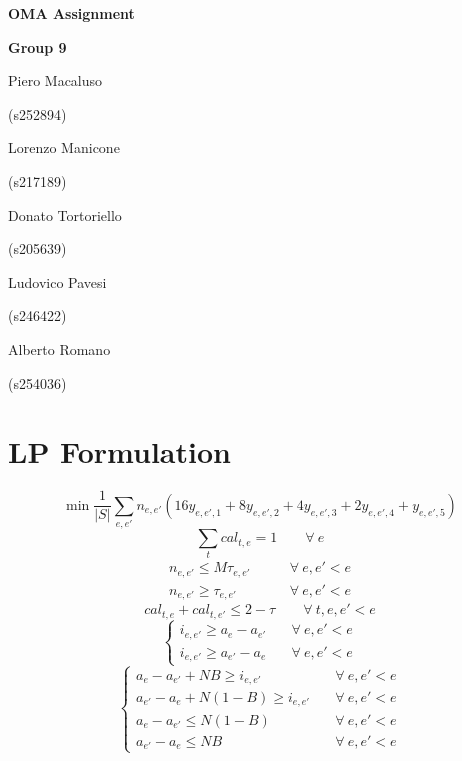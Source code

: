 \documentclass[11pt, a4paper, leqno]{article}
\newcommand{\nome}[2]{
\begin{minipage}[t]{0.185\linewidth}
	\centering #1\par
	\centering\small (#2)\par
\end{minipage}
}
\begin{document}
	
	\begin{center}
		{\huge\textbf{OMA Assignment}}\par
		\vspace{0.3em}
		{\large\textbf{Group 9}}\par
		\vspace{1em}
		\nome{Piero Macaluso}{s252894}
		\nome{Lorenzo Manicone}{s217189}
		\nome{Donato Tortoriello}{s205639}
		\nome{Ludovico Pavesi}{s246422}
		\nome{Alberto Romano}{s254036} %
	\end{center}

	\section{LP Formulation}

	\begin{equation}
		\tag{Objective function}
		\label{of}
		\min\frac{1}{\left|S\right|
		}\sum_{e,e'} n_{e,e'}\left(16y_{e,e',1}+8y_{e,e',2}+4y_{e,e',3}+2y_{e,e',4}+y_{e,e',5}\right)
	\end{equation}
	\begin{equation}
		\label{apply}
		\sum_{t} cal_{t,e} = 1 \qquad\forall\ e
	\end{equation}
	\begin{equation}
	\label{conflict1}
	\begin{aligned}
	n_{e,e'} \leq M\tau_{e,e'} &\qquad \forall\ e,e'<e \\
	n_{e,e'} \geq \tau_{e,e'} &\qquad \forall\ e,e'<e
	\end{aligned}
	\end{equation}
	\begin{equation}
	\label{conflict2}
	cal_{t,e}+cal_{t,e'} \leq 2 - \tau \qquad \forall\ t,e,e'<e
	\end{equation}
	\begin{equation}
	\label{distance1}
	\begin{cases}
	i_{e,e'} \geq a_e-a_{e'}&\quad \forall\ e,e'<e\\
	i_{e,e'} \geq a_{e'}-a_e&\quad \forall\ e,e'<e
	\end{cases}
	\end{equation}
	\begin{equation}
	\begin{cases}
	\label{distance2}
	a_e-a_{e'} + NB \geq i_{e,e'}&\quad \forall\ e,e'<e\\
	a_{e'}-a_e + N(1-B) \geq i_{e,e'}&\quad \forall\ e,e'<e\\
	a_e-a_{e'} \leq N(1-B)&\quad \forall\ e,e'<e\\
	a_{e'}-a_e \leq NB&\quad \forall\ e,e'<e
	\end{cases}
	\end{equation}
\end{document}
